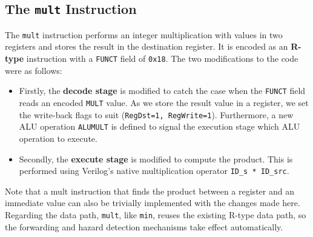 \documentclass[conference]{IEEEtran}
\begin{document}
\subsection{The \texttt{mult} Instruction}
The \texttt{mult} instruction performs an integer multiplication with values in
two registers and stores the result in the destination register. It is encoded
as an \textbf{R-type} instruction with a \texttt{FUNCT} field of \texttt{0x18}.
The two modifications to the code were as follows:
\begin{itemize}
    \item Firstly, the \textbf{decode stage} is modified to catch the case when
        the \texttt{FUNCT} field reads an encoded \texttt{MULT} value. As we
        store the result value in a register, we set the write-back flags to
        suit (\texttt{RegDst=1, RegWrite=1}). Furthermore, a new ALU operation
        \texttt{ALUMULT} is defined to signal the execution stage which ALU
        operation to execute.
    \item Secondly, the \textbf{execute stage} is modified to compute the
        product. This is performed using Verilog's native multiplication
        operator \texttt{ID\_s * ID\_src}.
\end{itemize}
Note that a mult instruction that finds the product between a register and an
immediate value can also be trivially implemented with the changes made here. Regarding the data path, \texttt{mult}, like \texttt{min}, reuses the existing R-type data path, so the forwarding and hazard detection mechanisms take effect automatically.
\end{document}
